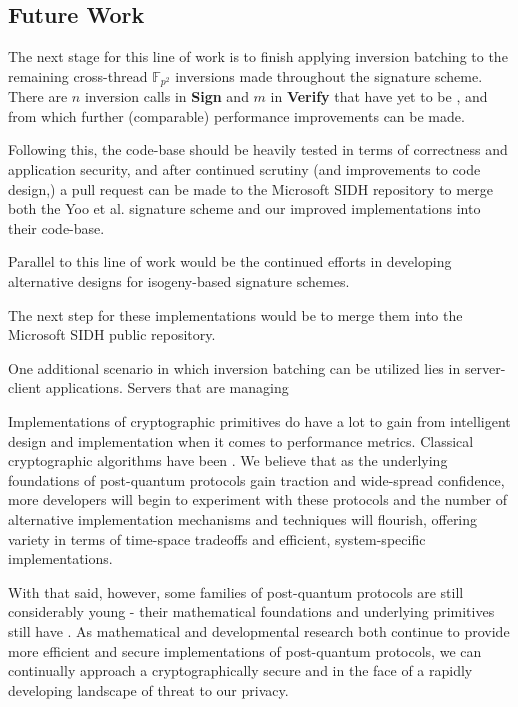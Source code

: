 \subsection{Future Work}
\label{sec:morebatch}

The next stage for this line of work is to finish applying inversion batching to the remaining cross-thread $\mathbb{F}_{p^2}$ inversions made throughout the signature scheme. There are $n$ inversion calls in \textbf{Sign} and $m$ in \textbf{Verify} that have yet to be , and from which further (comparable) performance improvements can be made.

Following this, the code-base should be heavily tested in terms of correctness and application security, and after continued scrutiny (and improvements to code design,) a pull request can be made to the Microsoft SIDH repository \cite{sidhcode} to merge both the Yoo et al. signature scheme and our improved implementations into their code-base. 

Parallel to this line of work would be the continued efforts in developing alternative designs for isogeny-based signature schemes. 

The next step for these implementations would be to merge them into the Microsoft SIDH public repository.

One additional scenario in which inversion batching can be utilized lies in server-client applications. Servers that are managing 

\vspace{50px}

Implementations of cryptographic primitives do have a lot to gain from intelligent design and implementation when it comes to performance metrics. Classical cryptographic algorithms have been . We believe that as the underlying foundations of post-quantum protocols gain traction and wide-spread confidence, more developers will begin to experiment with these protocols and the number of alternative implementation mechanisms and techniques will flourish, offering variety in terms of time-space tradeoffs and efficient, system-specific implementations. 

With that said, however, some families of post-quantum protocols are still considerably young - their mathematical foundations and underlying primitives still have . As mathematical and developmental research both continue to provide more efficient and secure implementations of post-quantum protocols, we can continually approach a cryptographically secure and in the face of a rapidly developing landscape of threat to our privacy. 
